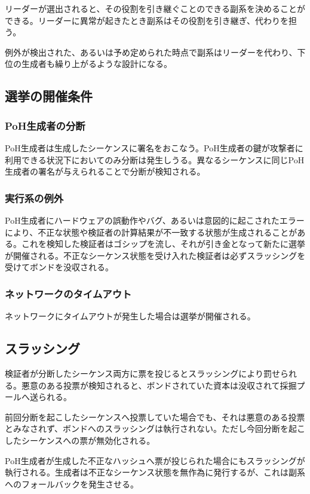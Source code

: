 \documentclass[12pt]{ltjsarticle}
\begin{document}
リーダーが選出されると、その役割を引き継ぐことのできる副系を決めることができる。リーダーに異常が起きたとき副系はその役割を引き継ぎ、代わりを担う。

例外が検出された、あるいは予め定められた時点で副系はリーダーを代わり、下位の生成者も繰り上がるような設計になる。

\subsection{選挙の開催条件}
\subsubsection{PoH生成者の分断}

PoH生成者は生成したシーケンスに署名をおこなう。PoH生成者の鍵が攻撃者に利用できる状況下においてのみ分断は発生しうる。異なるシーケンスに同じPoH生成者の署名が与えられることで分断が検知される。

\subsubsection{実行系の例外}
PoH生成者にハードウェアの誤動作やバグ、あるいは意図的に起こされたエラーにより、不正な状態や検証者の計算結果が不一致する状態が生成されることがある。これを検知した検証者はゴシップを流し、それが引き金となって新たに選挙が開催される。不正なシーケンス状態を受け入れた検証者は必ずスラッシングを受けてボンドを没収される。

\subsubsection{ネットワークのタイムアウト}

ネットワークにタイムアウトが発生した場合は選挙が開催される。

\subsection{スラッシング}
検証者が分断したシーケンス両方に票を投じるとスラッシングにより罰せられる。悪意のある投票が検知されると、ボンドされていた資本は没収されて採掘プールへ送られる。

前回分断を起こしたシーケンスへ投票していた場合でも、それは悪意のある投票とみなされず、ボンドへのスラッシングは執行されない。ただし今回分断を起こしたシーケンスへの票が無効化される。

PoH生成者が生成した不正なハッシュへ票が投じられた場合にもスラッシングが執行される。生成者は不正なシーケンス状態を無作為に発行するが、これは副系へのフォールバックを発生させる。
\end{document}
